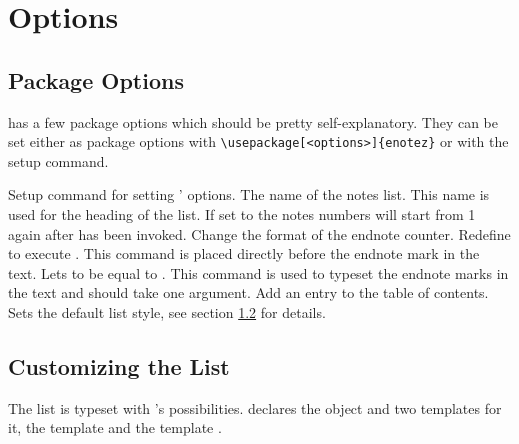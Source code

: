 \documentclass[toc=bib,toc=index]{cnpkgdoc}
\begin{document}
\section{Options}
\subsection{Package Options}
\enotez has a few package options which should be pretty self-explanatory. They
can be set either as package options with \verb=\usepackage[<options>]{enotez}=
or with the setup command.
\begin{beschreibung}
  Setup command for setting \enotez' options.
   The name of the notes list. This name is used for the heading of the list.
   If set to  the notes numbers will start from 1 again after
    has been invoked.
   Change the format of the endnote counter.
 \Default
   Redefine  to execute . This command is placed
   directly before the endnote mark in the text.
   Lets  to be equal to . This command is
   used to typeset the endnote marks in the text and should take one argument.
   Add an entry to the table of contents.
   Sets the default list style, see section \ref{ssec:customizing_the_list} for
   details.
\end{beschreibung}

\subsection{Customizing the List}\label{ssec:customizing_the_list}
The list is typeset with 's possibilities. \enotez declares
the object  and two templates for it, the template 
and the template .
\end{document}
